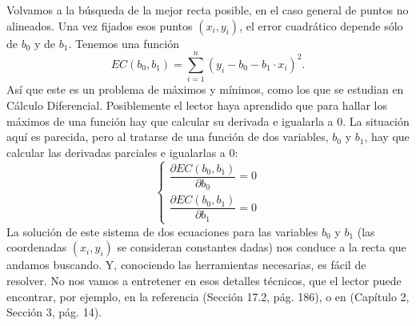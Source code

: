 Volvamos a la búsqueda de la mejor recta posible, en el caso general de puntos no alineados. Una vez fijados esos puntos $(x_i,y_i)$, el error cuadrático depende sólo de $b_0$ y de $b_1$. Tenemos una función
\[EC(b_0,b_1) = \sum_{i=1}^n(y_i-b_0-b_1\cdot x_i)^2.\]
Así que este es un problema de máximos y mínimos, como los que se estudian en Cálculo Diferencial. Posiblemente el lector haya aprendido que para hallar los máximos de una función hay que calcular su derivada e igualarla a $0$. La situación aquí es parecida, pero al tratarse de una función de dos variables, $b_0$ y $b_1$, hay que calcular las derivadas parciales e igualarlas a $0$:
\begin{equation}
\label{cap10:ecu:SistemaDerivadasParcialesMinimosCuadrados}
\begin{cases}
\dfrac{\partial EC(b_0,b_1)}{\partial b_0}=0\\[3mm]
\dfrac{\partial EC(b_0,b_1)}{\partial b_1}=0
\end{cases}
\end{equation}
La solución de este sistema de dos ecuaciones para las variables $b_0$ y $b_1$ (las coordenadas $(x_i, y_i)$ se consideran constantes dadas)  nos conduce a la recta que andamos buscando.  Y,
conociendo las herramientas necesarias, es fácil de resolver. No nos vamos a entretener en esos detalles técnicos, que el lector puede encontrar, por ejemplo, en la referencia \cite{garcia2009estadistica} (Sección 17.2, pág. 186), o en \cite{horra2003estadistica} (Capítulo 2, Sección 3, pág. 14).


